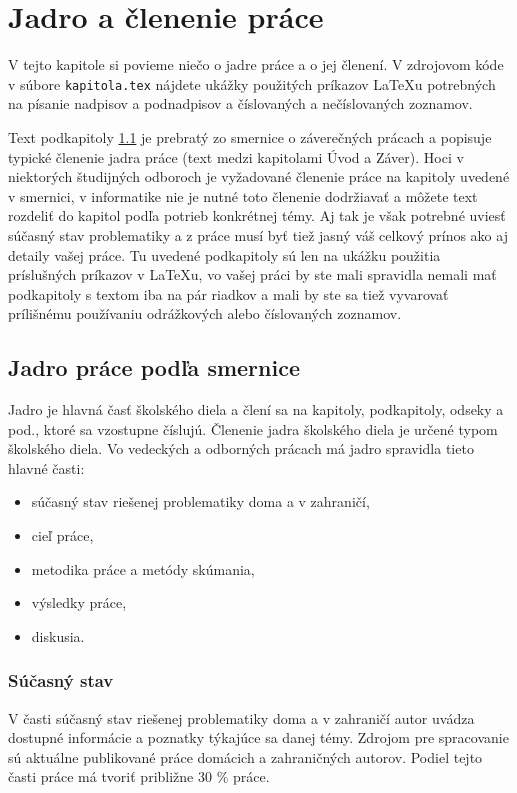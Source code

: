 \chapter{Jadro a členenie práce}

\label{kap:clenenie} %

V tejto kapitole si povieme niečo o jadre práce a o jej členení. V
zdrojovom kóde v súbore \verb'kapitola.tex' nájdete ukážky použitých
príkazov LaTeXu potrebných na písanie nadpisov a podnadpisov a
číslovaných a nečíslovaných zoznamov.

Text podkapitoly \ref{sec:jadro} je
prebratý zo smernice o záverečných prácach \cite[článok 5]{smernica} a popisuje typické členenie jadra práce (text medzi kapitolami Úvod a Záver). Hoci v niektorých študijných odboroch je vyžadované členenie práce na kapitoly uvedené v smernici, v informatike nie je nutné toto členenie dodržiavať a môžete text rozdeliť do kapitol podľa potrieb konkrétnej témy. Aj tak je však potrebné uviesť súčasný stav problematiky a z práce musí byť tiež jasný váš celkový prínos ako aj detaily vašej práce. Tu uvedené podkapitoly sú len na ukážku použitia príslušných príkazov v LaTeXu, vo vašej práci by ste mali spravidla nemali mať podkapitoly s textom iba na pár riadkov a mali by ste sa tiež vyvarovať prílišnému používaniu odrážkových alebo číslovaných zoznamov.

\section{Jadro práce podľa smernice}
\label{sec:jadro}
Jadro je hlavná časť školského diela a člení sa na kapitoly,
podkapitoly, odseky a pod., ktoré sa vzostupne číslujú.
Členenie jadra školského diela je určené typom  školského diela. Vo vedeckých 
a odborných prácach má jadro spravidla tieto hlavné časti:
\begin{itemize}
\item  súčasný stav riešenej problematiky doma a v zahraničí,
\item  cieľ práce,
\item  metodika práce a metódy skúmania,
\item  výsledky práce, 
\item  diskusia. 
\end{itemize}

\subsection{Súčasný stav}
V časti súčasný stav riešenej problematiky doma a v zahraničí autor uvádza 
dostupné informácie a poznatky týkajúce sa danej témy. Zdrojom pre spracovanie sú 
aktuálne publikované práce domácich a zahraničných autorov.  Podiel tejto časti práce 
má tvoriť približne 30 \% práce.

